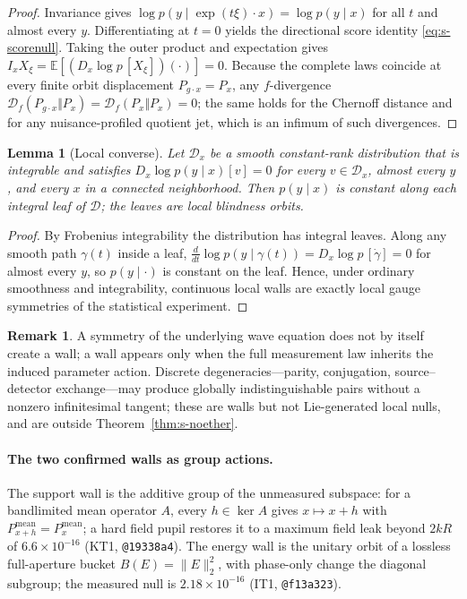 \documentclass[10pt,onecolumn]{article}
\theoremstyle{plain}
\newtheorem{lemma}{Lemma}
\theoremstyle{definition}
\newtheorem{remark}{Remark}
\begin{document}
\begin{proof}
Invariance gives $\log p(y\mid\exp(t\xi)\cdot x)=\log p(y\mid x)$ for all $t$ and
almost every $y$. Differentiating at $t=0$ yields the directional score identity
\eqref{eq:s-scorenull}. Taking the outer product and expectation gives
$I_x X_\xi=\mathbb E[(D_x\log p\,[X_\xi])(\cdot)]=0$. Because the complete laws
coincide at every finite orbit displacement $P_{g\cdot x}=P_x$, any $f$-divergence
$\mathcal D_f(P_{g\cdot x}\Vert P_x)=\mathcal D_f(P_x\Vert P_x)=0$; the same holds
for the Chernoff distance and for any nuisance-profiled quotient jet, which is an
infimum of such divergences.
\end{proof}

\begin{lemma}[Local converse]\label{lem:s-converse}
Let $\mathcal D_x$ be a smooth constant-rank distribution that is integrable and
satisfies $D_x\log p(y\mid x)[v]=0$ for every $v\in\mathcal D_x$, almost every $y$,
and every $x$ in a connected neighborhood. Then $p(y\mid x)$ is constant along each
integral leaf of $\mathcal D$; the leaves are local blindness orbits.
\end{lemma}

\begin{proof}
By Frobenius integrability the distribution has integral leaves. Along any smooth
path $\gamma(t)$ inside a leaf, $\tfrac{d}{dt}\log p(y\mid\gamma(t))=D_x\log
p\,[\dot\gamma]=0$ for almost every $y$, so $p(y\mid\cdot)$ is constant on the leaf.
Hence, under ordinary smoothness and integrability, continuous local walls are
exactly local gauge symmetries of the statistical experiment.
\end{proof}

\begin{remark}
A symmetry of the underlying wave equation does not by itself create a wall; a wall
appears only when the full measurement law inherits the induced parameter action.
Discrete degeneracies---parity, conjugation, source--detector exchange---may produce
globally indistinguishable pairs without a nonzero infinitesimal tangent; these are
walls but not Lie-generated local nulls, and are outside
Theorem~\ref{thm:s-noether}.
\end{remark}

\paragraph{The two confirmed walls as group actions.}
The support wall is the additive group of the unmeasured subspace: for a bandlimited
mean operator $A$, every $h\in\ker A$ gives $x\mapsto x+h$ with
$P^{\mathrm{mean}}_{x+h}=P^{\mathrm{mean}}_x$; a hard field pupil restores it to a
maximum field leak beyond $2kR$ of $6.6\times10^{-16}$ (KT1, \texttt{@19338a4}). The
energy wall is the unitary orbit of a lossless full-aperture bucket
$B(E)=\lVert E\rVert_2^2$, with phase-only change the diagonal subgroup; the measured
null is $2.18\times10^{-16}$ (IT1, \texttt{@f13a323}).
\end{document}
